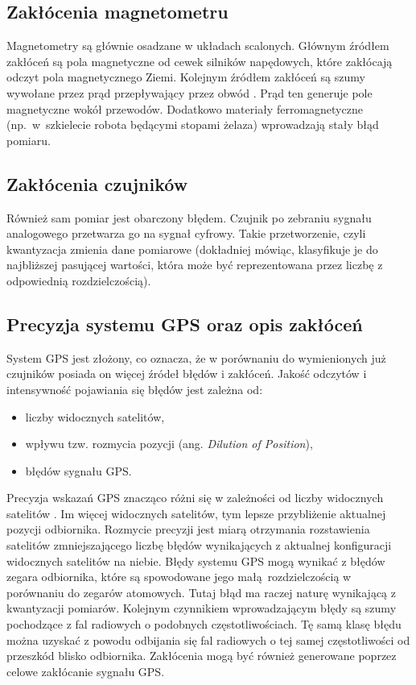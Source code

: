 {{        %
    }

    \label{mag_noises}
    \subsection{Zakłócenia magnetometru}
    {
        Magnetometry są głównie osadzane w układach scalonych. Głównym źródłem zakłóceń są pola magnetyczne od cewek silników napędowych, które zakłócają odczyt pola magnetycznego Ziemi. Kolejnym źródłem zakłóceń są szumy wywołane przez prąd przepływający przez obwód \cite{mag_noise}. Prąd ten generuje pole magnetyczne wokół przewodów. Dodatkowo materiały ferromagnetyczne (np.~w~szkielecie robota będącymi stopami żelaza) wprowadzają stały błąd pomiaru.
    }
    \subsection{Zakłócenia czujników}
    {
        Również sam pomiar jest obarczony błędem. Czujnik po zebraniu sygnału analogowego przetwarza go na sygnał cyfrowy. Takie przetworzenie, czyli kwantyzacja zmienia  dane pomiarowe (dokładniej mówiąc, klasyfikuje je do najbliższej pasującej wartości, która może być reprezentowana przez liczbę z odpowiednią rozdzielczością).
    }
    \subsection{Precyzja systemu GPS oraz opis zakłóceń}
    {
        System GPS jest złożony, co oznacza, że w porównaniu do wymienionych już czujników posiada on więcej źródeł błędów i zakłóceń. Jakość odczytów i intensywność pojawiania się błędów jest zależna od:
        \begin{itemize}
            \item liczby widocznych satelitów,
            \item wpływu tzw. rozmycia pozycji (ang. \textit{Dilution of Position}),
            \item błędów sygnału GPS.
        \end{itemize}

        Precyzja wskazań GPS znacząco różni się w zależności od liczby widocznych satelitów \cite{gps_principles}. Im więcej widocznych satelitów, tym lepsze przybliżenie aktualnej pozycji odbiornika. 
        Rozmycie precyzji jest miarą otrzymania rozstawienia satelitów zmniejszającego liczbę błędów wynikających z aktualnej konfiguracji widocznych satelitów na niebie.
        Błędy systemu GPS mogą wynikać z błędów zegara odbiornika, które są spowodowane jego małą rozdzielczością w porównaniu do zegarów atomowych. Tutaj błąd ma raczej naturę wynikającą z kwantyzacji pomiarów. Kolejnym czynnikiem wprowadzającym błędy są szumy pochodzące z fal radiowych o podobnych częstotliwościach. Tę samą klasę błędu można uzyskać z powodu odbijania się fal radiowych o tej samej częstotliwości od przeszkód blisko odbiornika. Zakłócenia mogą być również generowane poprzez celowe zakłócanie sygnału GPS.
    }
}
